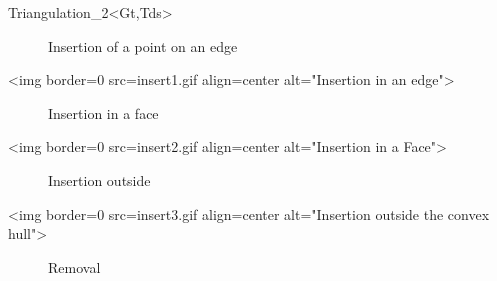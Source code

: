 \begin{ccClassTemplate}{Triangulation_2<Gt,Tds>}
\begin{ccTexOnly}
  \begin{figure}
    \begin{center}
     
    \end{center}
    \caption{Insertion of a point on an edge}
    \label{I1_Fig_inser1t}
  \end{figure}
\end{ccTexOnly}

\begin{ccHtmlOnly}
<img border=0 src=insert1.gif align=center alt="Insertion in an edge">
\end{ccHtmlOnly}




\begin{ccTexOnly}
  \begin{figure}
    \begin{center}
     
    \end{center}
    \caption{Insertion in a face}
    \label{I1_Fig_insert2}
  \end{figure}
\end{ccTexOnly}

\begin{ccHtmlOnly}
<img border=0 src=insert2.gif align=center alt="Insertion in a Face">
\end{ccHtmlOnly}


\begin{ccTexOnly}
  \begin{figure}
    \begin{center}
     
    \end{center}
     \caption{Insertion outside}
    \label{I1_Fig_insert3}
  \end{figure}
\end{ccTexOnly}

\begin{ccHtmlOnly}
<img border=0 src=insert3.gif align=center alt="Insertion outside the
convex hull">
\end{ccHtmlOnly}

\begin{ccTexOnly}
  \begin{figure}
    \begin{center}
     
    \end{center}
     \caption{Removal}
    \label{I1_Fig_remove}
  \end{figure}
\end{ccTexOnly}


\end{ccClassTemplate}
